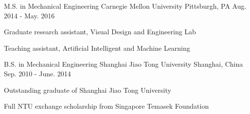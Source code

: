 

\begin{cventries}

  \cventry
    {M.S. in Mechanical Engineering} %
    {Carnegie Mellon University } %
    {Pittsburgh, PA} %
    {Aug. 2014 - May. 2016} %
    {
      \begin{cvitems} %
        \item {Graduate research assistant, Visual Design and Engineering Lab}
        \item {Teaching assistant, Artificial Intelligent and Machine Learning}
      \end{cvitems}
    }

  \cventry
    {B.S. in Mechanical Engineering} %
    {Shanghai Jiao Tong University} %
    {Shanghai, China} %
    {Sep. 2010 - June. 2014} %
    {
      \begin{cvitems} %
        \item {Outstanding graduate of Shanghai Jiao Tong University}
        \item {Full NTU exchange scholarship from Singapore Temasek Foundation}
      \end{cvitems}
    }

\end{cventries}
